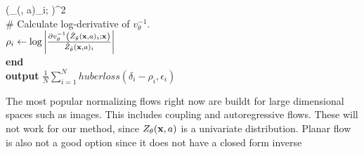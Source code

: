\documentclass[twoside]{article}
\begin{document}
\begin{algorithm}
  \left(_{\tilde{\theta}}(\rvx, a)_i; \rvx \right)^2\)\\
  \hspace*{2em} {\color{gray} \# Calculate log-derivative of \(v^{-1}_\theta\).}\\
  \hspace*{2em} \(\rho_i \gets \log \left\lvert \frac{\partial v_{\theta}^{-1} \left(\hat{Z}_{\tilde{\theta}}(\textbf{x}, a)_i; \textbf{x} \right)}{\hat{Z}_{\tilde{\theta}}(\textbf{x}, a)_i} \right\rvert\)\\
  \hspace*{1em} \textbf{end}\\
  \textbf{output} \(\frac{1}{N}\sum_{i=1}^N huberloss(\delta_i - \rho_i, \epsilon_i)\)
\end{algorithm}




The most popular normalizing flows right now are buildt for large dimensional
spaces such as images. This includes coupling and autoregressive flows. These
will not work for our method, since \(Z_\theta(\textbf{x}, a)\) is a univariate
distribution. Planar flow is also not a good option since it does not have a
closed form inverse
\end{document}
